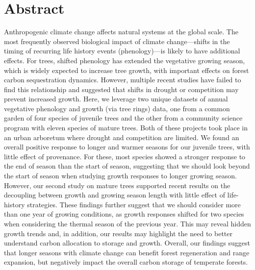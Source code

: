 


\chapter{Abstract}

Anthropogenic climate change affects natural systems at the global scale. The most frequently observed biological impact of climate change---shifts in the timing of recurring life history events (phenology)---is likely to have additional effects. For trees, shifted phenology has extended the vegetative growing season, which is widely expected to increase tree growth, with important effects on forest carbon sequestration dynamics. However, multiple recent studies have failed to find this relationship and suggested that shifts in drought or competition may prevent increased growth. Here, we leverage two unique datasets of annual vegetative phenology and growth (via tree rings) data, one from a common garden of four species of juvenile trees and the other from a community science program with eleven species of mature trees. Both of these projects took place in an urban arboretum where drought and competition are limited. We found an overall positive response to longer and warmer seasons for our juvenile trees, with little effect of provenance. For these, most species showed a stronger response to the end of season than the start of season, suggesting that we should look beyond the start of season when studying growth responses to longer growing season. However, our second study on mature trees supported recent results on the decoupling between growth and growing season length with little effect of life-history strategies. These findings further suggest that we should consider more than one year of growing conditions, as growth responses shifted for two species when considering the thermal season of the previous year. This may reveal hidden growth trends and, in addition, our results may highlight the need to better understand carbon allocation to storage and growth. Overall, our findings suggest that longer seasons with climate change can benefit forest regeneration and range expansion, but negatively impact the overall carbon storage of temperate forests.
